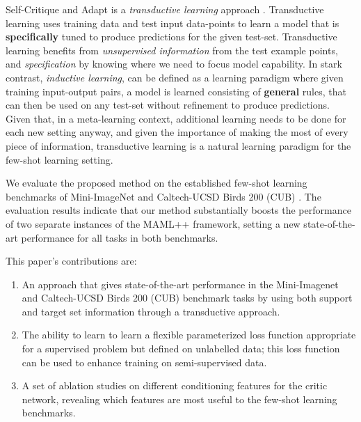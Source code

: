 \documentclass{article} \usepackage[dvipsnames]{xcolor}
\begin{document}
Self-Critique and Adapt is a \emph{transductive learning} approach \citep{vapnik200624}. Transductive learning uses training data and test input data-points to learn a model that is \textbf{specifically} tuned to produce predictions for the given test-set. Transductive learning benefits from \emph{unsupervised information} from the test example points, and \emph{specification} by knowing where we need to focus model capability.
In stark contrast, \emph{inductive learning}, can be defined as a learning paradigm where given training input-output pairs, a model is learned consisting of \textbf{general} rules, that can then be used on any test-set without refinement to produce predictions. Given that, in a meta-learning context, additional learning needs to be done for each new setting anyway, and given the importance of making the most of every piece of information, transductive learning is a natural learning paradigm for the few-shot learning setting.

We evaluate the proposed method on the established few-shot learning benchmarks of Mini-ImageNet \citep{ravi2016optimization} and Caltech-UCSD Birds 200 (CUB) \citep{chen2019closerfewshot}. The evaluation results indicate that our method substantially boosts the performance of two separate instances of the MAML++ \citep{antoniou2018train} framework, setting a new state-of-the-art performance for all tasks in both benchmarks.

This paper's contributions are:



\begin{enumerate}
    \item An approach that gives state-of-the-art performance in the Mini-Imagenet and Caltech-UCSD Birds 200 (CUB) benchmark tasks by using both support and target set information through a transductive approach.
    \item The ability to learn to learn a flexible parameterized loss function appropriate for a supervised problem but defined on unlabelled data; this loss function can be used to enhance training on semi-supervised data.
    \item A set of ablation studies on different conditioning features for the critic network, revealing which features are most useful to the few-shot learning benchmarks.
\end{enumerate}
\end{document}

